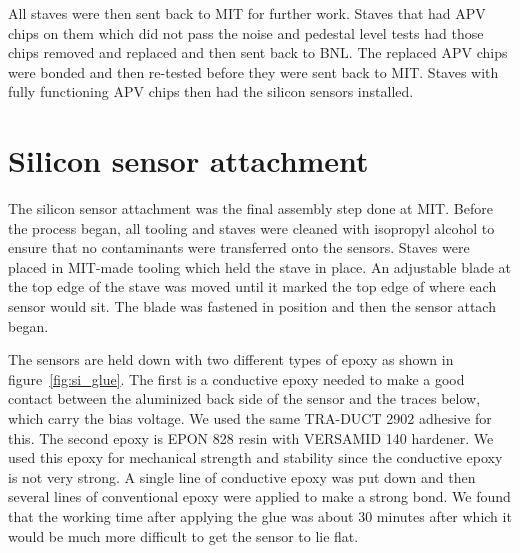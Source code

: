 \documentclass[1p,12pt]{elsarticle}
\begin{document}
All staves were then sent back to MIT for further work. Staves that had APV
chips on them which did not pass the noise and pedestal level tests had
those chips removed and replaced and then sent back to BNL. The replaced APV
chips were bonded and then re-tested before they were sent back to MIT. Staves
with fully functioning APV chips then had the silicon sensors installed.

\section{Silicon sensor attachment}
The silicon sensor attachment was the final assembly step done at MIT. Before the
process began, all tooling and staves were cleaned with isopropyl alcohol to
ensure that no contaminants were transferred onto the sensors. Staves were placed
in MIT-made tooling which held the stave in place. An adjustable blade at the
top edge of the stave was moved until it marked the top edge of where each sensor
would sit. The blade was fastened in position and then the sensor attach
began.

The sensors are held down with two different types of epoxy as shown in figure~\ref{fig:si_glue}. The first is a
conductive epoxy needed to make a good contact between the aluminized back side
of the sensor and the traces below, which carry the bias voltage. We used the
same TRA-DUCT 2902 adhesive for this. The second epoxy is EPON 828 resin with
VERSAMID 140 hardener. We used this epoxy for mechanical strength and stability since the
conductive epoxy is not very strong. A single line of conductive epoxy was put
down and then several lines of conventional epoxy were applied to make a strong
bond. We found that the working time after applying the glue was about 30
minutes after which it would be much more difficult to get the sensor to lie
flat.
\end{document}
